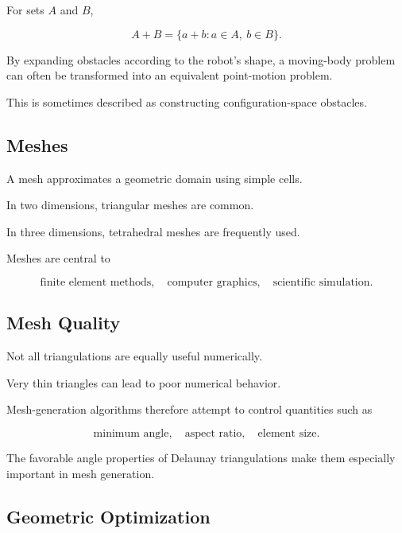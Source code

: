 For sets \(A\) and \(B\),

\[
A+B
=
\{a+b:a\in A,\ b\in B\}.
\]

By expanding obstacles according to the robot's shape, a moving-body problem
can often be transformed into an equivalent point-motion problem.

This is sometimes described as constructing configuration-space obstacles.

\subsection{Meshes}
\label{subsec:computational-meshes}

A mesh approximates a geometric domain using simple cells.

In two dimensions, triangular meshes are common.

In three dimensions, tetrahedral meshes are frequently used.

Meshes are central to

\[
\boxed{
\text{finite element methods},
\quad
\text{computer graphics},
\quad
\text{scientific simulation}.
}
\]

\subsection{Mesh Quality}
\label{subsec:mesh-quality}

Not all triangulations are equally useful numerically.

Very thin triangles can lead to poor numerical behavior.

Mesh-generation algorithms therefore attempt to control quantities such as

\[
\boxed{
\text{minimum angle},
\quad
\text{aspect ratio},
\quad
\text{element size}.
}
\]

The favorable angle properties of Delaunay triangulations make them
especially important in mesh generation.

\subsection{Geometric Optimization}
\label{subsec:geometric-optimization}

